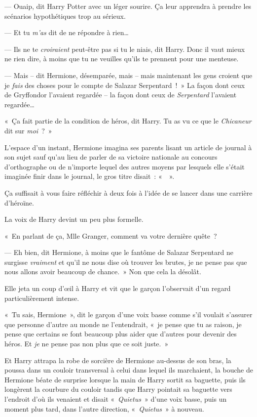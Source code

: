 --- Ouaip, dit Harry Potter avec un léger sourire. Ça leur apprendra à prendre les scénarios hypothétiques trop au sérieux.

--- Et tu \emph{m'as} dit de ne répondre à rien…

--- Ils ne te \emph{croiraient} peut-être pas si tu le niais, dit Harry. Donc il vaut mieux ne rien dire, à moins que tu ne veuilles qu'ils te prennent pour une menteuse.

--- Mais -- dit Hermione, désemparée, mais -- mais maintenant les gens croient que je \emph{fais} des choses pour le compte de Salazar Serpentard~!~» La façon dont ceux de Gryffondor l'avaient regardée -- la façon dont ceux de \emph{Serpentard} l'avaient regardée…

«~Ça fait partie de la condition de héros, dit Harry. Tu as vu ce que le \emph{Chicaneur} dit sur \emph{moi}~?~»

L'espace d'un instant, Hermione imagina ses parents lisant un article de journal à son sujet sauf qu'au lieu de parler de sa victoire nationale au concours d'orthographe ou de n'importe lequel des autres moyens par lesquels elle s'était imaginée finir dans le journal, le gros titre disait~: «~~».

Ça suffisait à vous faire réfléchir à deux fois à l'idée de se lancer dans une carrière d'héroïne.

La voix de Harry devint un peu plus formelle.

«~En parlant de ça, Mlle Granger, comment va votre dernière quête~?

--- Eh bien, dit Hermione, à moins que le fantôme de Salazar Serpentard ne surgisse \emph{vraiment} et qu'il ne nous dise où trouver les brutes, je ne pense pas que nous allons avoir beaucoup de chance.~» Non que cela la désolât.

Elle jeta un coup d'œil à Harry et vit que le garçon l'observait d'un regard particulièrement intense.

«~Tu sais, Hermione~», dit le garçon d'une voix basse comme s'il voulait s'assurer que personne d'autre au monde ne l'entendrait, «~je pense que tu as raison, je pense que certains se font beaucoup plus aider que d'autres pour devenir des héros. Et \emph{je} ne pense pas non plus que ce soit juste.~»

Et Harry attrapa la robe de sorcière de Hermione au-dessus de son bras, la poussa dans un couloir transversal à celui dans lequel ils marchaient, la bouche de Hermione béate de surprise lorsque la main de Harry sortit sa baguette, puis ils longèrent la courbure du couloir tandis que Harry pointait sa baguette vers l'endroit d'où ils venaient et disait «~\emph{Quietus}~» d'une voix basse, puis un moment plus tard, dans l'autre direction, «~\emph{Quietus}~» à nouveau.

